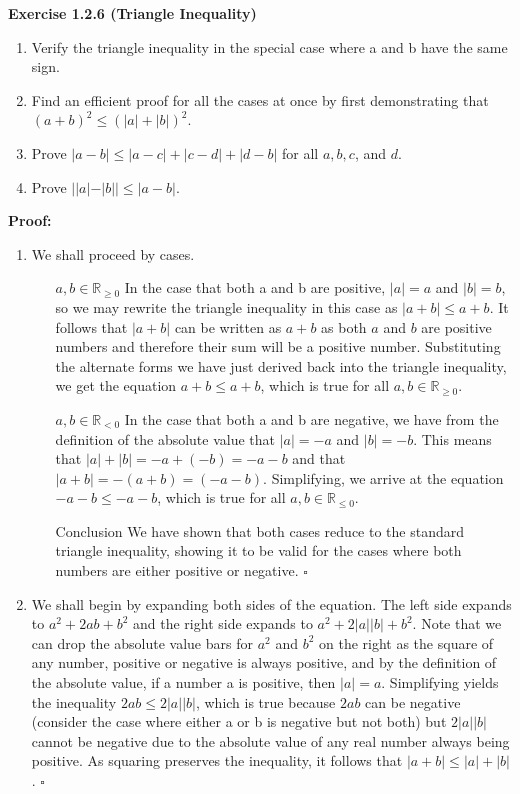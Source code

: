 \documentclass[12 pt]{article}
\newcommand{\qed}[0]{$\square$}
\begin{document}
\newpage

\textbf{Exercise 1.2.6 (Triangle Inequality)}
\begin{enumerate}
\item Verify the triangle inequality in the special case where a and b have the same sign.
\item Find an efficient proof for all the cases at once by first demonstrating that $(a+b)^2 \leq (|a|+|b|)^2$.
\item Prove $|a-b| \leq |a-c| + |c-d| + |d-b|$ for all $a, b,c$, and $d$.
\item Prove $||a|-|b|| \leq |a-b|$.
\end{enumerate}

\textbf{Proof:}
\begin{enumerate}
\item We shall proceed by cases. 
\begin{enumerate}
\item[\(a,b \in \mathbb{R}_{\geq 0}\)] In the case that both a and b are positive, \(|a| = a\) and \(|b| = b\), so we may rewrite the triangle inequality in this case as  \(|a + b| \leq a + b\). It follows that \(|a + b|\) can be written as \(a + b\) as both \(a\) and \(b\) are positive numbers and therefore their sum will be a positive number. Substituting the alternate forms we have just derived back into the triangle inequality, we get the equation \(a + b \leq a + b\), which is true for all \(a, b \in \mathbb{R}_{\geq 0}\). 
\item[\(a,b \in \mathbb{R}_{< 0}\)] In the case that both a and b are negative, we have from the definition of the absolute value that \(|a| = -a\) and \(|b| = -b\). This means that \(|a| + |b| = -a + (-b) = -a - b\) and that \(|a+b|= -(a+b) = (-a - b)\). Simplifying, we arrive at the equation \(-a -b \leq -a - b\), which is true for all \(a, b \in \mathbb{R}_{\leq 0}\).
\item[Conclusion] We have shown that both cases reduce to the standard triangle inequality, showing it to be valid for the cases where both numbers are either positive or negative. \qed 
\end{enumerate}

\item We shall begin by expanding both sides of the equation. The left side expands to $a^2 + 2ab + b^2$ and the right side expands to \(a^2 + 2|a||b| + b^2\). Note that we can drop the absolute value bars for \(a^2\) and \(b^2\) on the right as the square of any number, positive or negative is always positive, and by the definition of the absolute value, if a number a is positive, then \(|a| = a\). Simplifying yields the inequality \(2ab \leq 2|a||b|\), which is true because \(2ab\) can be negative (consider the case where either a or b is negative but not both) but \(2|a||b|\) cannot be negative due to the absolute value of any real number always being positive. As squaring preserves the inequality, it follows that \(|a + b| \leq |a| + |b|\). \qed


\end{enumerate}
\end{document}
